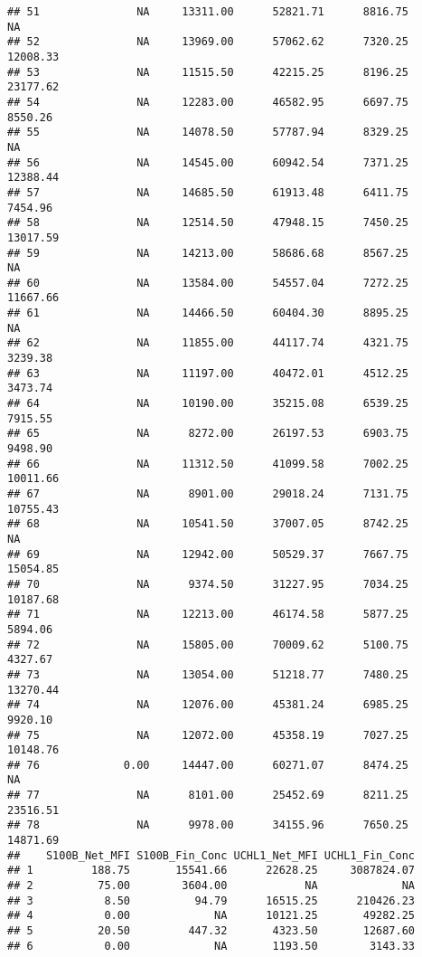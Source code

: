\documentclass[]{article}
\begin{document}
\begin{verbatim}
## 51               NA     13311.00      52821.71      8816.75            NA
## 52               NA     13969.00      57062.62      7320.25      12008.33
## 53               NA     11515.50      42215.25      8196.25      23177.62
## 54               NA     12283.00      46582.95      6697.75       8550.26
## 55               NA     14078.50      57787.94      8329.25            NA
## 56               NA     14545.00      60942.54      7371.25      12388.44
## 57               NA     14685.50      61913.48      6411.75       7454.96
## 58               NA     12514.50      47948.15      7450.25      13017.59
## 59               NA     14213.00      58686.68      8567.25            NA
## 60               NA     13584.00      54557.04      7272.25      11667.66
## 61               NA     14466.50      60404.30      8895.25            NA
## 62               NA     11855.00      44117.74      4321.75       3239.38
## 63               NA     11197.00      40472.01      4512.25       3473.74
## 64               NA     10190.00      35215.08      6539.25       7915.55
## 65               NA      8272.00      26197.53      6903.75       9498.90
## 66               NA     11312.50      41099.58      7002.25      10011.66
## 67               NA      8901.00      29018.24      7131.75      10755.43
## 68               NA     10541.50      37007.05      8742.25            NA
## 69               NA     12942.00      50529.37      7667.75      15054.85
## 70               NA      9374.50      31227.95      7034.25      10187.68
## 71               NA     12213.00      46174.58      5877.25       5894.06
## 72               NA     15805.00      70009.62      5100.75       4327.67
## 73               NA     13054.00      51218.77      7480.25      13270.44
## 74               NA     12076.00      45381.24      6985.25       9920.10
## 75               NA     12072.00      45358.19      7027.25      10148.76
## 76             0.00     14447.00      60271.07      8474.25            NA
## 77               NA      8101.00      25452.69      8211.25      23516.51
## 78               NA      9978.00      34155.96      7650.25      14871.69
##    S100B_Net_MFI S100B_Fin_Conc UCHL1_Net_MFI UCHL1_Fin_Conc
## 1         188.75       15541.66      22628.25     3087824.07
## 2          75.00        3604.00            NA             NA
## 3           8.50          94.79      16515.25      210426.23
## 4           0.00             NA      10121.25       49282.25
## 5          20.50         447.32       4323.50       12687.60
## 6           0.00             NA       1193.50        3143.33

\end{verbatim}
\end{document}
